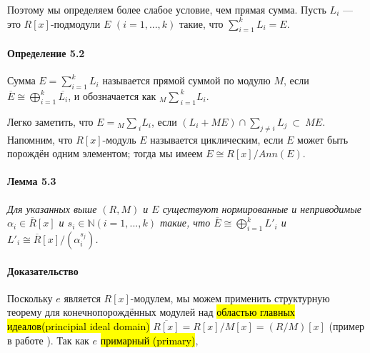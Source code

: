 \documentclass[a4paper,12pt]{article}
\newcommand{\dirsummod}[1]{{_{{#1}}\!\!\sum}}
\begin{document}
Поэтому мы определяем более слабое условие, чем прямая сумма. Пусть $L_i$ --- это $R[x]$-подмодули $E$ $(i = 1,...,k)$ такие, что $\sum_{i=1}^{k} L_i = E$.

\paragraph{Определение 5.2}
Сумма $E = \sum_{i=1}^{k} L_i$ называется прямой суммой по модулю $M$, если $\overline{E} \cong \bigoplus_{i=1}^{k} \overline{L_i}$, и обозначается как $\dirsummod{M}_{i=1}^{k} L_i$.

Легко заметить, что $E = \dirsummod{M}_i L_i$, если $(L_i + M E) \cap \sum_{j \ne i} L_j ~ \subset ~ M E$. Напомним, что $R[x]$-модуль $E$ называется циклическим, если $E$ может быть порождён одним элементом; тогда мы имеем $E \cong R[x]/Ann(E)$.

\paragraph{Лемма 5.3}
{\itshape
Для указанных выше $(R, M)$ и $E$ существуют нормированные и неприводимые $\alpha_i \in \overline{R}[x]$ и $s_i \in \mathbb{N} (i = 1,...,k)$ такие, что $\overline{E} \cong \bigoplus_{i=1}^{k} L'_i$ и $L'_i \cong \overline{R}[x]/(\alpha_i^{s_j})$.
}

\paragraph{Доказательство}

Поскольку $e$ является $R[x]$-модулем, мы можем применить структурную теорему для конечнопорождённых модулей над \hl{областью главных идеалов(principial ideal domain)} $\overline{R[x]} = R[x]/M[x] = (R/M)[x]$ (пример в работе \cite{bib3}). Так как $e$ \hl{примарный (primary)}, 
\end{document}
